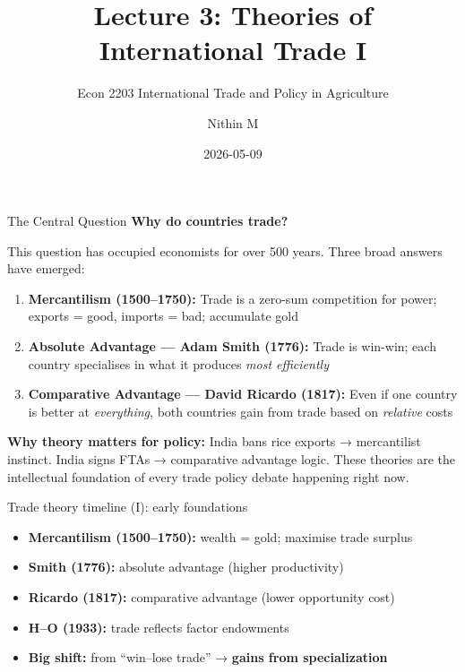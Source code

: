 \documentclass[
  ignorenonframetext,
  aspectratio=169,
]{beamer}
\title[L3 \textbar{} Trade Theories I]{Lecture 3: Theories of
International Trade I}
\subtitle{Econ 2203 \textbar{} International Trade and Policy in
Agriculture}
\author{Nithin M}
\date{2026-05-09}
\institute{Department of Development Economics}
\makeatletter
\providecommand{\tightlist}{%
  \setlength{\itemsep}{0pt}\setlength{\parskip}{0pt}}
\let\quarto@originallabel\label
\DeclareRobustCommand*{\label}[1]{\quarto@originallabel{#1}}
\makeatother
\begin{document}
\frame{\titlepage}


\begin{frame}{The Central Question}
\label{the-central-question}
\textbf{Why do countries trade?}

This question has occupied economists for over 500 years. Three broad
answers have emerged:

\begin{enumerate}
\tightlist
\item
  \textbf{Mercantilism (1500--1750):} Trade is a zero-sum competition
  for power; exports = good, imports = bad; accumulate gold
\end{enumerate}

\begin{enumerate}
\setcounter{enumi}{1}
\tightlist
\item
  \textbf{Absolute Advantage --- Adam Smith (1776):} Trade is win-win;
  each country specialises in what it produces \emph{most efficiently}
\end{enumerate}

\begin{enumerate}
\setcounter{enumi}{2}
\tightlist
\item
  \textbf{Comparative Advantage --- David Ricardo (1817):} Even if one
  country is better at \emph{everything}, both countries gain from trade
  based on \emph{relative} costs
\end{enumerate}

\textbf{Why theory matters for policy:} India bans rice exports →
mercantilist instinct. India signs FTAs → comparative advantage logic.
These theories are the intellectual foundation of every trade policy
debate happening right now.
\end{frame}

\begin{frame}{Trade theory timeline (I): early foundations}
\label{trade-theory-timeline-i-early-foundations}
\begin{itemize}
\tightlist
\item
  \textbf{Mercantilism (1500--1750):} wealth = gold; maximise trade
  surplus
\item
  \textbf{Smith (1776):} absolute advantage (higher productivity)
\item
  \textbf{Ricardo (1817):} comparative advantage (lower opportunity
  cost)
\item
  \textbf{H--O (1933):} trade reflects factor endowments
\item
  \textbf{Big shift:} from ``win--lose trade'' → \textbf{gains from
  specialization}
\end{itemize}
\end{frame}
\end{document}
